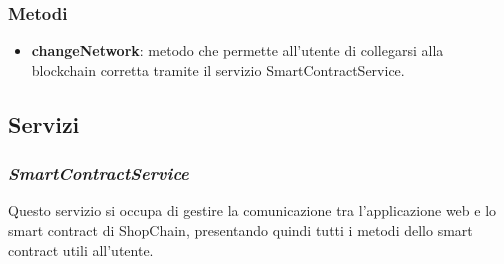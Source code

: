 \subsubsection{Metodi}
\begin{itemize}
    \item \textbf{changeNetwork}: metodo che permette all'utente di collegarsi alla blockchain corretta tramite il servizio SmartContractService.
\end{itemize}


\subsection{Servizi}
\subsubsection*{\textit{SmartContractService}}
\label{sec:smart-contract-service}
Questo servizio si occupa di gestire la comunicazione tra l'applicazione web e lo smart contract di ShopChain, presentando quindi tutti i metodi dello smart contract utili all'utente.


